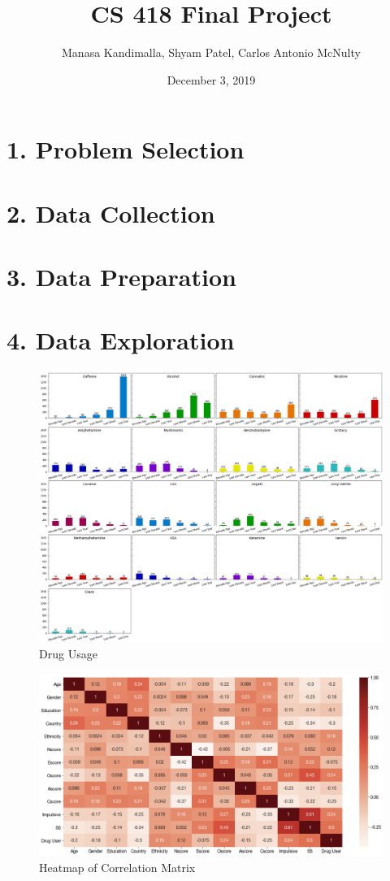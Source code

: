 \documentclass[10pt]{article}
\title{CS 418 Final Project}
\date{December 3, 2019}
\author {Manasa Kandimalla, Shyam Patel, Carlos Antonio McNulty}
\begin{document}
\maketitle

\section*{1. Problem Selection}

\section*{2. Data Collection}

\section*{3. Data Preparation}

\section*{4. Data Exploration}

\begin{figure}[H]
\caption{Drug Usage}
\centering
\includegraphics[scale=0.25]{drugs.png}
\end{figure}


\begin{figure}[H]
\caption{Heatmap of Correlation Matrix}
\centering
\includegraphics[scale=0.25]{heatmap.png}
\end{figure}
\end{document}
